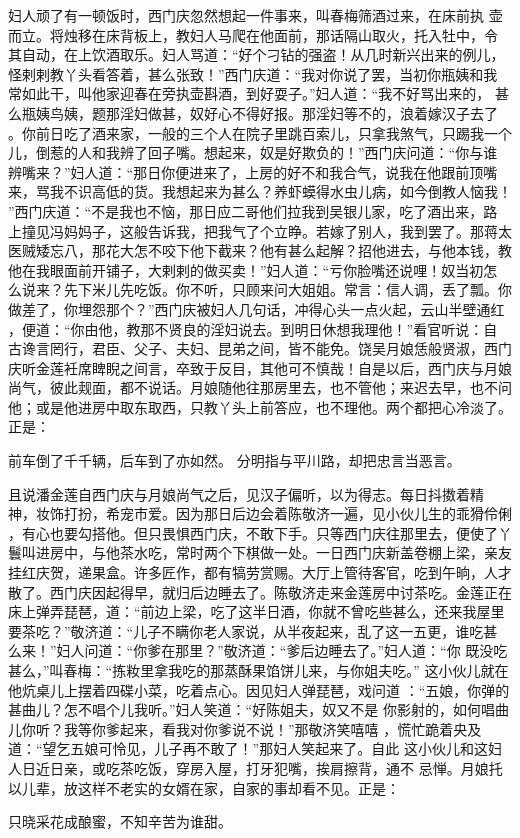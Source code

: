 妇人顽了有一顿饭时，西门庆忽然想起一件事来，叫春梅筛酒过来，在床前执
壶而立。将烛移在床背板上，教妇人马爬在他面前，那话隔山取火，托入牡中，令
其自动，在上饮酒取乐。妇人骂道：“好个刁钻的强盗！从几时新兴出来的例儿，
怪剌剌教丫头看答着，甚么张致！”西门庆道：“我对你说了罢，当初你瓶姨和我
常如此干，叫他家迎春在旁执壶斟酒，到好耍子。”妇人道：“我不好骂出来的，
甚么瓶姨鸟姨，题那淫妇做甚，奴好心不得好报。那淫妇等不的，浪着嫁汉子去了
。你前日吃了酒来家，一般的三个人在院子里跳百索儿，只拿我煞气，只踢我一个
儿，倒惹的人和我辨了回子嘴。想起来，奴是好欺负的！”西门庆问道：“你与谁
辨嘴来？”妇人道：“那日你便进来了，上房的好不和我合气，说我在他跟前顶嘴
来，骂我不识高低的货。我想起来为甚么？养虾蟆得水虫儿病，如今倒教人恼我！
”西门庆道：“不是我也不恼，那日应二哥他们拉我到吴银儿家，吃了酒出来，路
上撞见冯妈妈子，这般告诉我，把我气了个立睁。若嫁了别人，我到罢了。那蒋太
医贼矮忘八，那花大怎不咬下他下截来？他有甚么起解？招他进去，与他本钱，教
他在我眼面前开铺子，大剌剌的做买卖！”妇人道：“亏你脸嘴还说哩！奴当初怎
么说来？先下米儿先吃饭。你不听，只顾来问大姐姐。常言：信人调，丢了瓢。你
做差了，你埋怨那个？”西门庆被妇人几句话，冲得心头一点火起，云山半壁通红
，便道：“你由他，教那不贤良的淫妇说去。到明日休想我理他！”看官听说：自
古谗言罔行，君臣、父子、夫妇、昆弟之间，皆不能免。饶吴月娘恁般贤淑，西门
庆听金莲衽席睥睨之间言，卒致于反目，其他可不慎哉！自是以后，西门庆与月娘
尚气，彼此觌面，都不说话。月娘随他往那房里去，也不管他；来迟去早，也不问
他；或是他进房中取东取西，只教丫头上前答应，也不理他。两个都把心冷淡了。
正是：

前车倒了千千辆，后车到了亦如然。
分明指与平川路，却把忠言当恶言。

且说潘金莲自西门庆与月娘尚气之后，见汉子偏听，以为得志。每日抖擞着精
神，妆饰打扮，希宠市爱。因为那日后边会着陈敬济一遍，见小伙儿生的乖猾伶俐
，有心也要勾搭他。但只畏惧西门庆，不敢下手。只等西门庆往那里去，便使了丫
鬟叫进房中，与他茶水吃，常时两个下棋做一处。一日西门庆新盖卷棚上梁，亲友
挂红庆贺，递果盒。许多匠作，都有犒劳赏赐。大厅上管待客官，吃到午晌，人才
散了。西门庆因起得早，就归后边睡去了。陈敬济走来金莲房中讨茶吃。金莲正在
床上弹弄琵琶，道：“前边上梁，吃了这半日酒，你就不曾吃些甚么，还来我屋里
要茶吃？”敬济道：“儿子不瞒你老人家说，从半夜起来，乱了这一五更，谁吃甚
么来！”妇人问道：“你爹在那里？”敬济道：“爹后边睡去了。”妇人道：“你
既没吃甚么，”叫春梅：“拣籹里拿我吃的那蒸酥果馅饼儿来，与你姐夫吃。”
这小伙儿就在他炕桌儿上摆着四碟小菜，吃着点心。因见妇人弹琵琶，戏问道
：“五娘，你弹的甚曲儿？怎不唱个儿我听。”妇人笑道：“好陈姐夫，奴又不是
你影射的，如何唱曲儿你听？我等你爹起来，看我对你爹说不说！”那敬济笑嘻嘻
，慌忙跪着央及道：“望乞五娘可怜见，儿子再不敢了！”那妇人笑起来了。自此
这小伙儿和这妇人日近日亲，或吃茶吃饭，穿房入屋，打牙犯嘴，挨肩擦背，通不
忌惮。月娘托以儿辈，放这样不老实的女婿在家，自家的事却看不见。正是：

只晓采花成酿蜜，不知辛苦为谁甜。